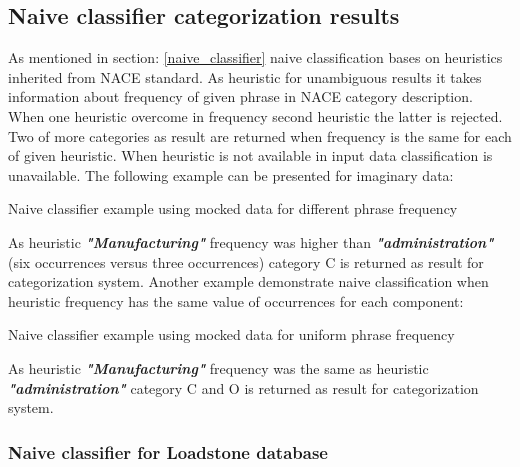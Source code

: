     
\subsection{Naive classifier categorization results}
As mentioned in section: \ref{naive_classifier} naive classification bases on heuristics inherited from NACE standard. As heuristic for unambiguous results it takes information about frequency of given phrase in NACE category description. When one heuristic overcome in frequency second heuristic the latter is rejected. Two of more categories as result are returned when frequency is the same for each of given heuristic. When heuristic is not available in input data classification is unavailable. The following example can be presented for imaginary data:
\begin{algorithm}
	
	\hfill \break
	\caption{Naive classifier example using mocked data for different phrase frequency}
	\label{alg:3rd}
\end{algorithm}
\newline
As heuristic \textbf{\textit{"Manufacturing"}} frequency was higher than \textbf{\textit{"administration"}} (six occurrences versus three occurrences) category C is returned as result for categorization system.
\newline
Another example demonstrate naive classification when heuristic frequency has the same value of occurrences for each component:
\begin{algorithm}
	
	\hfill \break
	\caption{Naive classifier example using mocked data for uniform phrase frequency}
	\label{alg:4th}
\end{algorithm}
\newline  
As heuristic \textbf{\textit{"Manufacturing"}} frequency was the same as heuristic \textbf{\textit{"administration"}} category C and O is returned as result for categorization system.

\subsubsection{Naive classifier for Loadstone database}


